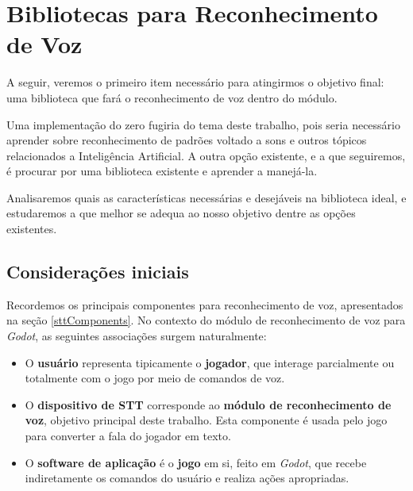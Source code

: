 \chapter{Bibliotecas para Reconhecimento de Voz}
\label{cap:speech-libs}

A seguir, veremos o primeiro item necessário para atingirmos o objetivo final: uma biblioteca que fará o reconhecimento de voz dentro do módulo.

Uma implementação do zero fugiria do tema deste trabalho, pois seria necessário aprender sobre reconhecimento de padrões voltado a sons e outros tópicos relacionados a Inteligência Artificial. A outra opção existente, e a que seguiremos, é procurar por uma biblioteca existente e aprender a manejá-la.

Analisaremos quais as características necessárias e desejáveis na biblioteca ideal, e estudaremos a que melhor se adequa ao nosso objetivo dentre as opções existentes.


\section{Considerações iniciais}

Recordemos os principais componentes para reconhecimento de voz, apresentados na seção \ref{sttComponents}. No contexto do módulo de reconhecimento de voz para \textit{Godot}, as seguintes associações surgem naturalmente:

\begin{itemize}
\item O \textbf{usuário} representa tipicamente o \textbf{jogador}, que interage parcialmente ou totalmente com o jogo por meio de comandos de voz.

\item O \textbf{dispositivo de STT} corresponde ao \textbf{módulo de reconhecimento de voz}, objetivo principal deste trabalho. Esta componente é usada pelo jogo para converter a fala do jogador em texto.

\item O \textbf{software de aplicação} é o \textbf{jogo} em si, feito em \textit{Godot}, que recebe indiretamente os comandos do usuário e realiza ações apropriadas.
\end{itemize}


